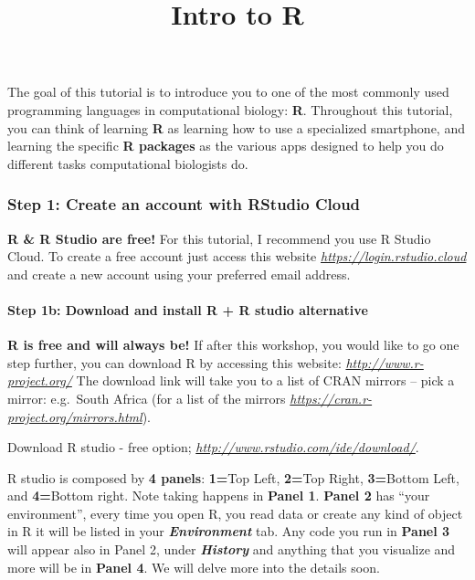 \documentclass[]{article}
\title{Intro to R}
\author{}
\date{\vspace{-2.5em}}
\let\oldparagraph\paragraph
\renewcommand{\paragraph}[1]{\oldparagraph{#1}\mbox{}}
\begin{document}
\maketitle

The goal of this tutorial is to introduce you to one of the most
commonly used programming languages in computational biology:
\textbf{R}. Throughout this tutorial, you can think of learning
\textbf{R} as learning how to use a specialized smartphone, and learning
the specific \textbf{R packages} as the various apps designed to help
you do different tasks computational biologists do.

\hypertarget{step-1-create-an-account-with-rstudio-cloud}{%
\subsubsection{Step 1: Create an account with RStudio
Cloud}\label{step-1-create-an-account-with-rstudio-cloud}}

\textbf{R \& R Studio are free!} For this tutorial, I recommend you use
R Studio Cloud. To create a free account just access this website
\emph{\url{https://login.rstudio.cloud}} and create a new account using
your preferred email address.

\hypertarget{step-1b-download-and-install-r-r-studio-alternative}{%
\paragraph{Step 1b: Download and install R + R studio
alternative}\label{step-1b-download-and-install-r-r-studio-alternative}}

\textbf{R is free and will always be!} If after this workshop, you would
like to go one step further, you can download R by accessing this
website: \emph{\url{http://www.r-project.org/}} The download link will
take you to a list of CRAN mirrors -- pick a mirror: e.g.~South Africa
(for a list of the mirrors
\emph{\url{https://cran.r-project.org/mirrors.html}}).

Download R studio - free option;
\emph{\url{http://www.rstudio.com/ide/download/}}.

R studio is composed by \textbf{4 panels}: \textbf{1=}Top Left,
\textbf{2=}Top Right, \textbf{3=}Bottom Left, and \textbf{4=}Bottom
right. Note taking happens in \textbf{Panel 1}. \textbf{Panel 2} has
``your environment'', every time you open R, you read data or create any
kind of object in R it will be listed in your
\textbf{\emph{Environment}} tab. Any code you run in \textbf{Panel 3}
will appear also in Panel 2, under \textbf{\emph{History}} and anything
that you visualize and more will be in \textbf{Panel 4}. We will delve
more into the details soon.
\end{document}
